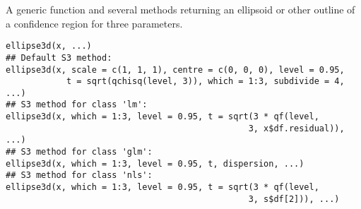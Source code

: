 \begin{Description}\relax
A generic function and several methods
returning an ellipsoid or other outline of a confidence region
for three parameters.
\end{Description}
\begin{Usage}
\begin{verbatim}
ellipse3d(x, ...)
## Default S3 method:
ellipse3d(x, scale = c(1, 1, 1), centre = c(0, 0, 0), level = 0.95, 
            t = sqrt(qchisq(level, 3)), which = 1:3, subdivide = 4, ...)
## S3 method for class 'lm':
ellipse3d(x, which = 1:3, level = 0.95, t = sqrt(3 * qf(level, 
                                                3, x$df.residual)), ...)     
## S3 method for class 'glm':
ellipse3d(x, which = 1:3, level = 0.95, t, dispersion, ...) 
## S3 method for class 'nls':
ellipse3d(x, which = 1:3, level = 0.95, t = sqrt(3 * qf(level, 
                                                3, s$df[2])), ...) 
\end{verbatim}
\end{Usage}
